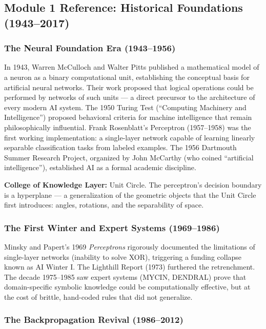 \documentclass[11pt,letterpaper]{article}
\begin{document}
\subsection{Module 1 Reference: Historical Foundations (1943--2017)}

\subsubsection{The Neural Foundation Era (1943--1956)}

In 1943, Warren McCulloch and Walter Pitts published a mathematical model of a neuron as a binary computational unit, establishing the conceptual basis for artificial neural networks. Their work proposed that logical operations could be performed by networks of such units --- a direct precursor to the architecture of every modern AI system. The 1950 Turing Test (``Computing Machinery and Intelligence'') proposed behavioral criteria for machine intelligence that remain philosophically influential. Frank Rosenblatt's Perceptron (1957--1958) was the first working implementation: a single-layer network capable of learning linearly separable classification tasks from labeled examples. The 1956 Dartmouth Summer Research Project, organized by John McCarthy (who coined ``artificial intelligence''), established AI as a formal academic discipline.

\textbf{College of Knowledge Layer:} Unit Circle. The perceptron's decision boundary is a hyperplane --- a generalization of the geometric objects that the Unit Circle first introduces: angles, rotations, and the separability of space.

\subsubsection{The First Winter and Expert Systems (1969--1986)}

Minsky and Papert's 1969 \textit{Perceptrons} rigorously documented the limitations of single-layer networks (inability to solve XOR), triggering a funding collapse known as AI Winter I. The Lighthill Report (1973) furthered the retrenchment. The decade 1975--1985 saw expert systems (MYCIN, DENDRAL) prove that domain-specific symbolic knowledge could be computationally effective, but at the cost of brittle, hand-coded rules that did not generalize.

\subsubsection{The Backpropagation Revival (1986--2012)}
\end{document}
